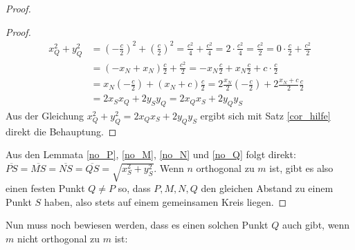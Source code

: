 \begin{proof}
\begin{proof}
\begin{align*}
            x_Q^2+y_Q^2&=\left(-\frac{c}{2}\right)^2+\left(\frac{c}{2}\right)^2=\frac{c^2}{4}+\frac{c^2}{4}
            =2\cdot \frac{c^2}{4}=\frac{c^2}{2}=0\cdot \frac{c}{2}+\frac{c^2}{2}\\
            &=(-x_N+x_N)\frac{c}{2}+\frac{c^2}{2}=-x_N\frac{c}{2}+x_N\frac{c}{2}+c\cdot\frac{c}{2}\\
            &=x_N\left(-\frac{c}{2}\right)+(x_N+c)\frac{c}{2}=2\frac{x_N}{2}
            \left(-\frac{c}{2}\right)+2\frac{x_N+c}{2}\frac{c}{2}\\
            &=2x_Sx_Q+2y_Sy_Q=2x_Qx_S+2y_Qy_S
        \end{align*}
        Aus der Gleichung $x_Q^2+y_Q^2=2x_Qx_S+2y_Qy_S$ ergibt sich mit Satz \ref{cor_hilfe} direkt die Behauptung.
    \end{proof}
    Aus den Lemmata \ref{no_P}, \ref{no_M}, \ref{no_N} und \ref{no_Q} folgt direkt: 
    $\overline{PS}=\overline{MS}=\overline{NS}=\overline{QS}=\sqrt{x_S^2+y_S^2}$. Wenn $n$ orthogonal zu $m$ ist, 
    gibt es also einen festen Punkt $Q\neq P$ so, dass $P, M, N, Q$ den gleichen Abstand zu einem Punkt $S$ haben, 
    also stets auf einem gemeinsamen Kreis liegen.
    \renewcommand{\qedsymbol}{$\blacksquare$}
\end{proof}

Nun muss noch bewiesen werden, dass es einen solchen Punkt $Q$ auch gibt, wenn $m$ nicht orthogonal zu $m$ ist:

